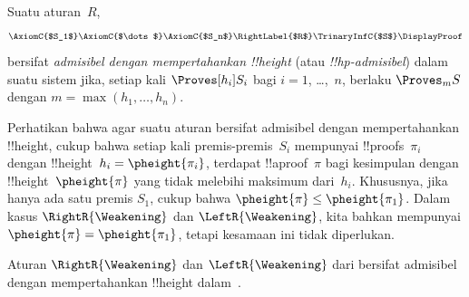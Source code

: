 \documentclass[../../../include/open-logic-section]{subfiles}
\begin{document}
\begin{defn}
Suatu aturan~$R$,
\[
\AxiomC{$S_1$}
\AxiomC{$\dots$}
\AxiomC{$S_n$}
\RightLabel{$R$}
\TrinaryInfC{$S$}
\DisplayProof
\]
bersifat \emph{admisibel dengan mempertahankan !!{height}}
(atau \emph{!!{hp}-admisibel}) dalam suatu sistem jika, setiap kali
$\Proves[h_i] S_i$ bagi $i=1$, \dots,~$n$, berlaku $\Proves_m S$ dengan
$m=\max(h_1,\dots,h_n)$.
\end{defn}

Perhatikan bahwa agar suatu aturan bersifat admisibel dengan mempertahankan
!!{height}, cukup bahwa setiap kali premis-premis~$S_i$ mempunyai
!!{proof}s~$\pi_i$ dengan !!{height}~$h_i=\pheight{\pi_i}$, terdapat
!!a{proof}~$\pi$ bagi kesimpulan dengan !!{height}~$\pheight{\pi}$ yang
tidak melebihi maksimum dari~$h_i$. Khususnya, jika hanya ada satu premis
$S_1$, cukup bahwa $\pheight{\pi}\leq\pheight{\pi_1}$. Dalam kasus
$\RightR{\Weakening}$ dan $\LeftR{\Weakening}$, kita bahkan mempunyai
$\pheight{\pi}=\pheight{\pi_1}$, tetapi kesamaan ini tidak diperlukan.

\begin{prop}
Aturan $\RightR{\Weakening}$ dan $\LeftR{\Weakening}$ dari 
bersifat admisibel dengan mempertahankan !!{height} dalam~.
\end{prop}
\end{document}
